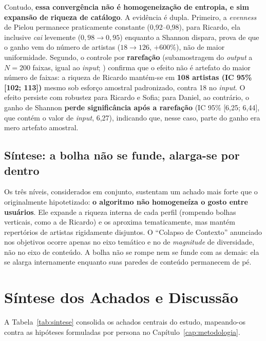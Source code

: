 \documentclass[12pt, %
openright,
oneside, %
a4paper,    %
english,   %
brazil]{facom-ufu-abntex2}
\begin{document}
Contudo, \textbf{essa convergência não é homogeneização de entropia, e sim
expansão de riqueza de catálogo}. A evidência é dupla. Primeiro, a \emph{evenness}
de Pielou permanece praticamente constante (0,92--0,98), para Ricardo, ela
inclusive \emph{cai} levemente ($0{,}98 \rightarrow 0{,}95$) enquanto a Shannon
dispara, prova de que o ganho vem do número de artistas ($18 \rightarrow 126$,
$+600\%$), não de maior uniformidade. Segundo, o controle por \textbf{rarefação}
(subamostragem do \emph{output} a $N = 200$ faixas, igual ao \emph{input};
) confirma que o efeito não é artefato do maior
número de faixas: a riqueza de Ricardo mantém-se em \textbf{108 artistas (IC 95\%
[102; 113])} mesmo sob esforço amostral padronizado, contra 18 no \emph{input}. O
efeito persiste com robustez para Ricardo e Sofia; para Daniel, ao contrário, o
ganho de Shannon \textbf{perde significância após a rarefação} (IC 95\% [6,25;
6,44], que contém o valor de \emph{input}, 6,27), indicando que, nesse caso, parte
do ganho era mero artefato amostral.

\subsection*{Síntese: a bolha não se funde, alarga-se por dentro}

Os três níveis, considerados em conjunto, sustentam um achado mais forte que o
originalmente hipotetizado: \textbf{o algoritmo não homogeneíza o gosto entre
usuários}. Ele expande a riqueza interna de cada perfil (rompendo bolhas
verticais, como a de Ricardo) e os aproxima tematicamente, mas mantém repertórios
de artistas rigidamente disjuntos. O ``Colapso de Contexto'' anunciado nos
objetivos ocorre apenas no eixo temático e no de \emph{magnitude} de diversidade,
não no eixo de conteúdo. A bolha não se rompe nem se funde com as demais: ela
se alarga internamente enquanto suas paredes de conteúdo permanecem de pé.

\section{Síntese dos Achados e Discussão}

A Tabela~\ref{tab:sintese} consolida os achados centrais do estudo, mapeando-os
contra as hipóteses formuladas por persona no Capítulo~\ref{cap:metodologia}.
\end{document}
